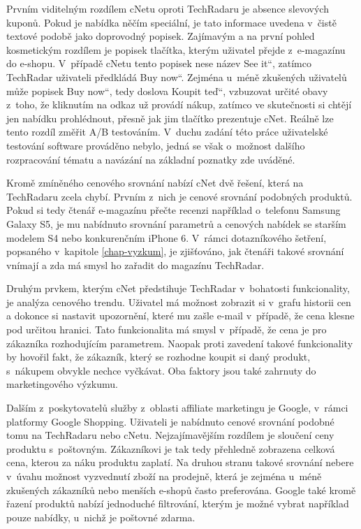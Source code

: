 \documentclass[12pt,twoside,openany]{fithesis}
\begin{document}
Prvním viditelným rozdílem cNetu oproti TechRadaru je absence slevových 
kuponů. Pokud je nabídka něčím speciální, je tato informace uvedena 
v~čistě textové podobě jako doprovodný popisek. Zajímavým a na první 
pohled kosmetickým rozdílem je popisek tlačítka, kterým uživatel přejde 
z~e-magazínu do e-shopu. V~případě cNetu tento popisek nese název \glqq 
See it\textquotedblleft{}, zatímco TechRadar uživateli předkládá \glqq Buy 
now\textquotedblleft{}. Zejména u~méně zkušených uživatelů může 
popisek \glqq Buy now\textquotedblleft{}, tedy doslova \glqq Koupit 
teď\textquotedblleft{}, vzbuzovat určité obavy z~toho, že kliknutím na 
odkaz už provádí nákup, zatímco ve skutečnosti si chtějí jen nabídku 
prohlédnout, přesně jak jim tlačítko prezentuje cNet. Reálně lze tento 
rozdíl změřit A/B testováním. \cite{ab-testing}{} V~duchu zadání této 
práce uživatelské testování software prováděno nebylo, jedná se však 
o~možnost dalšího rozpracování tématu a navázání na základní 
poznatky zde uváděné.

Kromě zmíněného cenového srovnání nabízí cNet dvě řešení, která 
na TechRadaru zcela chybí. Prvním z~nich je cenové srovnání podobných 
produktů. Pokud si tedy čtenář e-magazínu přečte recenzi například 
o~telefonu Samsung Galaxy S5, je mu nabídnuto srovnání parametrů a 
cenových nabídek se starším modelem S4 nebo konkurenčním iPhone 6. 
V~rámci dotazníkového šetření, popsaného v~kapitole 
\hyperlink{chap-vyzkum}{{\ref{chap-vyzkum}}}, je zjišťováno, jak čtenáři 
takové srovnání vnímají a zda má smysl ho zařadit do magazínu TechRadar.

Druhým prvkem, kterým cNet předstihuje TechRadar v~bohatosti funkcionality, 
je analýza cenového trendu. Uživatel má možnost zobrazit si v~grafu 
historii cen a dokonce si nastavit upozornění, které mu zašle e-mail 
v~případě, že cena klesne pod určitou hranici. Tato funkcionalita má 
smysl v~případě, že cena je pro zákazníka rozhodujícím parametrem. 
Naopak proti zavedení takové funkcionality by hovořil fakt, že zákazník, 
který se rozhodne koupit si daný produkt, s~nákupem obvykle nechce 
vyčkávat. Oba faktory jsou také zahrnuty do marketingového výzkumu.

Dalším z~poskytovatelů služby z~oblasti affiliate marketingu je Google, 
v~rámci platformy Google Shopping. Uživateli je nabídnuto cenové srovnání 
podobné tomu na TechRadaru nebo cNetu. Nejzajímavějším rozdílem je 
sloučení ceny produktu s~poštovným. Zákazníkovi je tak tedy přehledně 
zobrazena celková cena, kterou za náku produktu zaplatí. Na druhou stranu 
takové srovnání nebere v~úvahu možnost vyzvednutí zboží na prodejně, 
která je zejména u~méně zkušených zákazníků nebo menších e-shopů 
často preferována. Google také kromě řazení produktů nabízí 
jednoduché filtrování, kterým je možné vybrat například pouze nabídky, 
u~nichž je poštovné zdarma.
\end{document}
